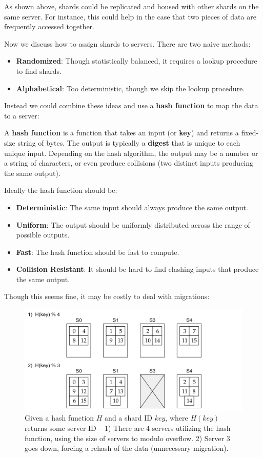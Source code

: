 \noindent
As shown above, shards could be replicated and housed with other shards on the same server.
For instance, this could help in the case that two pieces of data are frequently accessed together.

\newpage 
\noindent
Now we discuss how to assign shards to servers. There are two naive methods:
\begin{itemize}
    \item \textbf{Randomized}: Though statistically balanced, it requires a lookup procedure to find shards.
    \item \textbf{Alphabetical}: Too deterministic, though we skip the lookup procedure.
\end{itemize}

\noindent
Instead we could combine these ideas and use a \textbf{hash function} to map the data to a server:
\begin{Def}

    A \textbf{hash function} is a function that takes an input (or \textbf{key}) and returns a fixed-size string of bytes. The output is typically a \textbf{digest} that is unique to each unique input.
    Depending on the hash algorithm, the output may be a number or a string of characters, or even produce collisions (two distinct inputs producing the same output).
\end{Def}
\noindent
Ideally the hash function should be:
\begin{itemize}
    \item \textbf{Deterministic}: The same input should always produce the same output.
    \item \textbf{Uniform}: The output should be uniformly distributed across the range of possible outputs.
    \item \textbf{Fast}: The hash function should be fast to compute.
    \item \textbf{Collision Resistant}: It should be hard to find clashing inputs that produce the same output.
\end{itemize}
\noindent
Though this seems fine, it may be costly to deal with migrations:
\begin{figure}[h]
    
        \centering
        \includegraphics[width=\textwidth]{Sections/shard/mig.png}
        \caption{Given a hash function $H$ and a shard ID $key$, where $H(key)$ returns some server ID -- 1) There are 4 servers utilizing the hash function, using the size of servers
        to modulo overflow. 2) Server 3 goes down, forcing a rehash of the data (unnecessary migration).}
        \label{fig:shard}
\end{figure}

